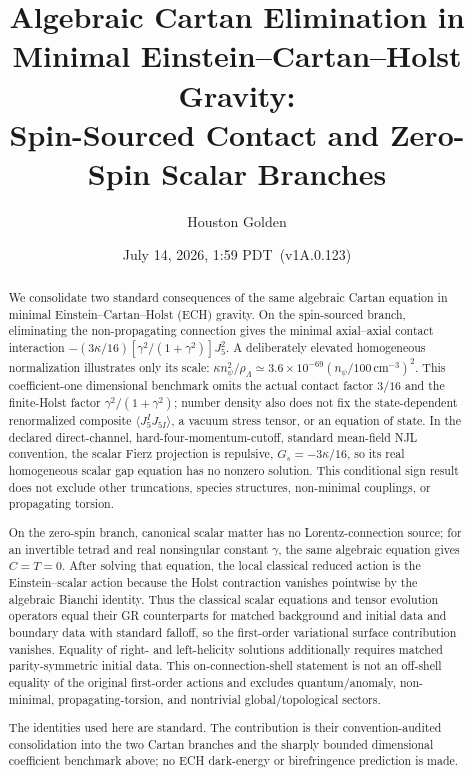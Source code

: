 \documentclass[aps,prd,twocolumn,superscriptaddress,preprintnumbers,nofootinbib,longbibliography,floatfix]{revtex4-2}
\newcommand{\paperVersion}{v1A.0.123}
\newcommand{\paperTimestamp}{July 14, 2026, 1:59 PDT}
\begin{document}

\title{Algebraic Cartan Elimination in Minimal Einstein--Cartan--Holst Gravity:\\
Spin-Sourced Contact and Zero-Spin Scalar Branches}

\author{Houston Golden}

\date{\paperTimestamp\ (\paperVersion)}

\begin{abstract}
We consolidate two standard consequences of the same algebraic Cartan
equation in minimal Einstein--Cartan--Holst (ECH) gravity.  On the
spin-sourced branch, eliminating the non-propagating connection gives the
minimal axial--axial contact interaction
$-(3\kappa/16)[\gamma^2/(1+\gamma^2)]J_5^2$.  A deliberately elevated
homogeneous normalization illustrates only its scale:
$\kappa n_\psi^2/\rho_\Lambda\simeq
3.6\times10^{-69}(n_\psi/100\,\mathrm{cm}^{-3})^2$.
This coefficient-one dimensional benchmark omits the actual contact factor
$3/16$ and the finite-Holst factor $\gamma^2/(1+\gamma^2)$; number density
also does not fix the state-dependent renormalized composite
$\langle J_5^I J_{5I}\rangle$, a vacuum stress tensor, or an equation of
state.  In the declared direct-channel, hard-four-momentum-cutoff, standard
mean-field NJL convention, the scalar Fierz projection is repulsive,
$G_s=-3\kappa/16$, so its real homogeneous scalar gap equation has no nonzero
solution.  This conditional sign result does not exclude other truncations,
species structures, non-minimal couplings, or propagating torsion.

On the zero-spin branch, canonical scalar matter has no Lorentz-connection
source; for an invertible tetrad and real nonsingular constant $\gamma$, the
same algebraic equation gives $C=T=0$.  After solving that equation, the local
classical reduced action is the Einstein--scalar action because the Holst
contraction vanishes pointwise by the algebraic Bianchi identity.  Thus the
classical scalar equations and tensor evolution operators equal their GR
counterparts for matched background and initial data and boundary data with
standard falloff, so the first-order variational surface contribution
vanishes.  Equality of right- and left-helicity solutions additionally
requires matched parity-symmetric initial data.  This on-connection-shell
statement is not an off-shell equality
of the original first-order actions and excludes quantum/anomaly,
non-minimal, propagating-torsion, and nontrivial global/topological sectors.

The identities used here are standard.  The contribution is their
convention-audited consolidation into the two Cartan branches and the sharply
bounded dimensional coefficient benchmark above; no ECH dark-energy or
birefringence prediction is made.
\end{abstract}
\end{document}
